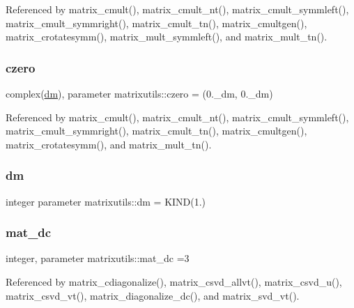 Referenced by matrix\+\_\+cmult(), matrix\+\_\+cmult\+\_\+nt(), matrix\+\_\+cmult\+\_\+symmleft(), matrix\+\_\+cmult\+\_\+symmright(), matrix\+\_\+cmult\+\_\+tn(), matrix\+\_\+cmultgen(), matrix\+\_\+crotatesymm(), matrix\+\_\+mult\+\_\+symmleft(), and matrix\+\_\+mult\+\_\+tn().

\mbox{\label{namespacematrixutils_a61466f9df90b39a99a491000d4419d75}} 
\subsubsection{\texorpdfstring{czero}{czero}}
{\footnotesize\ttfamily complex(\mbox{\hyperlink{namespacematrixutils_a7bdc564986ea4d90f51201c75606ef3d}{dm}}), parameter matrixutils\+::czero = (0.\+\_\+dm, 0.\+\_\+dm)}



Referenced by matrix\+\_\+cmult(), matrix\+\_\+cmult\+\_\+nt(), matrix\+\_\+cmult\+\_\+symmleft(), matrix\+\_\+cmult\+\_\+symmright(), matrix\+\_\+cmult\+\_\+tn(), matrix\+\_\+cmultgen(), matrix\+\_\+crotatesymm(), and matrix\+\_\+mult\+\_\+tn().

\mbox{\label{namespacematrixutils_a7bdc564986ea4d90f51201c75606ef3d}} 
\subsubsection{\texorpdfstring{dm}{dm}}
{\footnotesize\ttfamily integer parameter matrixutils\+::dm = K\+I\+ND(1.)}

\mbox{\label{namespacematrixutils_adc3f961dc571bc5ea1263f48e0574a79}} 
\subsubsection{\texorpdfstring{mat\+\_\+dc}{mat\_dc}}
{\footnotesize\ttfamily integer, parameter matrixutils\+::mat\+\_\+dc =3}



Referenced by matrix\+\_\+cdiagonalize(), matrix\+\_\+csvd\+\_\+allvt(), matrix\+\_\+csvd\+\_\+u(), matrix\+\_\+csvd\+\_\+vt(), matrix\+\_\+diagonalize\+\_\+dc(), and matrix\+\_\+svd\+\_\+vt().


